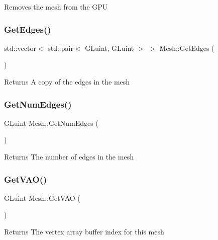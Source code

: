 Removes the mesh from the G\+PU \mbox{\label{classMesh_a4c31bac7ef0c5552e8dc692a33726ca3}} 
\subsubsection{\texorpdfstring{Get\+Edges()}{GetEdges()}}
{\footnotesize\ttfamily std\+::vector$<$ std\+::pair$<$ G\+Luint, G\+Luint $>$ $>$ Mesh\+::\+Get\+Edges (\begin{DoxyParamCaption}{ }\end{DoxyParamCaption})}

\begin{DoxyReturn}{Returns}
A copy of the edges in the mesh 
\end{DoxyReturn}
\mbox{\label{classMesh_adbbf05c59fd7cc170ceca2a0a71d7af1}} 
\subsubsection{\texorpdfstring{Get\+Num\+Edges()}{GetNumEdges()}}
{\footnotesize\ttfamily G\+Luint Mesh\+::\+Get\+Num\+Edges (\begin{DoxyParamCaption}{ }\end{DoxyParamCaption})}

\begin{DoxyReturn}{Returns}
The number of edges in the mesh 
\end{DoxyReturn}
\mbox{\label{classMesh_ad4917bc56c71f31974af4be3eb90a390}} 
\subsubsection{\texorpdfstring{Get\+V\+A\+O()}{GetVAO()}}
{\footnotesize\ttfamily G\+Luint Mesh\+::\+Get\+V\+AO (\begin{DoxyParamCaption}{ }\end{DoxyParamCaption})}

\begin{DoxyReturn}{Returns}
The vertex array buffer index for this mesh 
\end{DoxyReturn}
\mbox{\label{classMesh_aad4e49df1b12331d688d677f997360a5}} 

